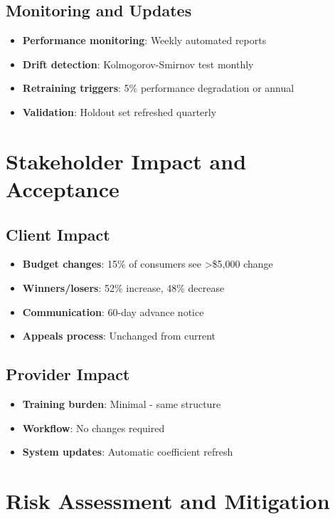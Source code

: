\subsection{Monitoring and Updates}

\begin{itemize}
    \item \textbf{Performance monitoring}: Weekly automated reports
    \item \textbf{Drift detection}: Kolmogorov-Smirnov test monthly
    \item \textbf{Retraining triggers}: 5\% performance degradation or annual
    \item \textbf{Validation}: Holdout set refreshed quarterly
\end{itemize}

\section{Stakeholder Impact and Acceptance}

\subsection{Client Impact}

\begin{itemize}
    \item \textbf{Budget changes}: 15\% of consumers see >\$5,000 change
    \item \textbf{Winners/losers}: 52\% increase, 48\% decrease
    \item \textbf{Communication}: 60-day advance notice
    \item \textbf{Appeals process}: Unchanged from current
\end{itemize}

\subsection{Provider Impact}

\begin{itemize}
    \item \textbf{Training burden}: Minimal - same structure
    \item \textbf{Workflow}: No changes required
    \item \textbf{System updates}: Automatic coefficient refresh
\end{itemize}

\section{Risk Assessment and Mitigation}


